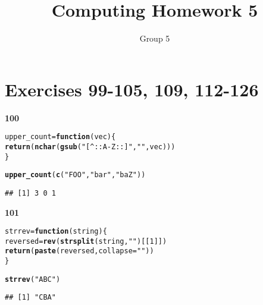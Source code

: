 \documentclass{article}\usepackage[]{graphicx}\usepackage[]{color}
\title{Computing Homework 5}
\author{Group 5}
\makeatletter
\newcommand{\hlnum}[1]{\textcolor[rgb]{0.686,0.059,0.569}{#1}}%
\newcommand{\hlstr}[1]{\textcolor[rgb]{0.192,0.494,0.8}{#1}}%
\newcommand{\hlstd}[1]{\textcolor[rgb]{0.345,0.345,0.345}{#1}}%
\newcommand{\hlkwa}[1]{\textcolor[rgb]{0.161,0.373,0.58}{\textbf{#1}}}%
\newcommand{\hlkwb}[1]{\textcolor[rgb]{0.69,0.353,0.396}{#1}}%
\newcommand{\hlkwc}[1]{\textcolor[rgb]{0.333,0.667,0.333}{#1}}%
\newcommand{\hlkwd}[1]{\textcolor[rgb]{0.737,0.353,0.396}{\textbf{#1}}}%
\newenvironment{kframe}{%
 \def\at@end@of@kframe{}%
 \ifinner\ifhmode%
  \def\at@end@of@kframe{\end{minipage}}%
  \begin{minipage}{\columnwidth}%
 \fi\fi%
 \def\FrameCommand##1{\hskip\@totalleftmargin \hskip-\fboxsep
 \colorbox{shadecolor}{##1}\hskip-\fboxsep
     \hskip-\linewidth \hskip-\@totalleftmargin \hskip\columnwidth}%
 \MakeFramed {\advance\hsize-\width
   \@totalleftmargin\z@ \linewidth\hsize
   \@setminipage}}%
 {\par\unskip\endMakeFramed%
 \at@end@of@kframe}
\newenvironment{knitrout}{}{} %
\makeatother
\begin{document}
\maketitle
\date{}

\section{Exercises 99-105, 109, 112-126}


\textbf{100}
\begin{knitrout}
\color{fgcolor}\begin{kframe}
\begin{alltt}
\hlstd{upper_count} \hlkwb{=} \hlkwa{function}\hlstd{(}\hlkwc{vec}\hlstd{) \{}
  \hlkwd{return}\hlstd{(}\hlkwd{nchar}\hlstd{(}\hlkwd{gsub}\hlstd{(}\hlstr{"[^::A-Z::]"}\hlstd{,}\hlstr{""}\hlstd{, vec)))}
\hlstd{\}}

\hlkwd{upper_count}\hlstd{(}\hlkwd{c}\hlstd{(}\hlstr{"FOO"}\hlstd{,} \hlstr{"bar"}\hlstd{,} \hlstr{"baZ"}\hlstd{))}
\end{alltt}
\begin{verbatim}
## [1] 3 0 1
\end{verbatim}
\end{kframe}
\end{knitrout}


\textbf{101}
\begin{knitrout}
\color{fgcolor}\begin{kframe}
\begin{alltt}
\hlstd{strrev} \hlkwb{=} \hlkwa{function}\hlstd{(}\hlkwc{string}\hlstd{) \{}
  \hlstd{reversed} \hlkwb{=} \hlkwd{rev}\hlstd{(}\hlkwd{strsplit}\hlstd{(string,} \hlstr{""}\hlstd{)[[}\hlnum{1}\hlstd{]])}
  \hlkwd{return}\hlstd{(}\hlkwd{paste}\hlstd{(reversed,} \hlkwc{collapse} \hlstd{=} \hlstr{""}\hlstd{))}
\hlstd{\}}

\hlkwd{strrev}\hlstd{(}\hlstr{"ABC"}\hlstd{)}
\end{alltt}
\begin{verbatim}
## [1] "CBA"
\end{verbatim}
\end{kframe}
\end{knitrout}
\end{document}
